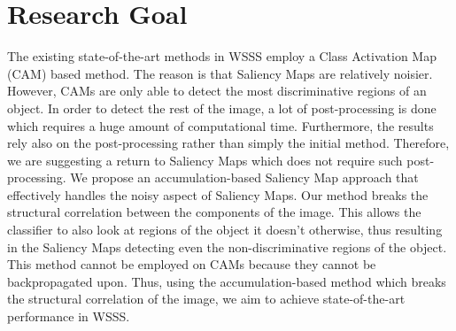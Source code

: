 \documentclass[11pt]{article}
\begin{document}
 \section{Research Goal}
The existing state-of-the-art methods in WSSS employ a Class Activation Map (CAM) based method. The reason is that Saliency Maps are relatively noisier. However,  CAMs are only able to detect the most discriminative regions of an object. In order to detect the rest of the image, a lot of post-processing is done which requires a huge amount of computational time. Furthermore, the results rely also on the post-processing rather than simply the initial method. Therefore,  we are suggesting a return to Saliency Maps which does not require such post-processing. We propose an accumulation-based Saliency Map approach that effectively handles the noisy aspect of Saliency Maps. Our method breaks the structural correlation between the components of the image. This allows the classifier to also look at regions of the object it doesn't otherwise, thus resulting in the Saliency Maps detecting even the non-discriminative regions of the object. This method cannot be employed on CAMs because they cannot be backpropagated upon. Thus, using the accumulation-based method which breaks the structural correlation of the image, we aim to achieve state-of-the-art performance in WSSS.
\end{document}
